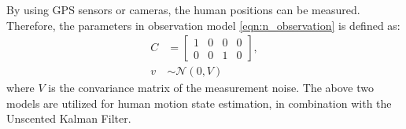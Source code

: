 \documentclass[letterpaper, 10 pt, conference]{ieeeconf}
\begin{document}
	By using GPS sensors or cameras, the human positions can be measured.
	Therefore, the parameters in observation model \cref{eqn:n_observation} is defined as:
	\begin{subequations}
		\begin{align}\label{eqn:meas_noise}
			C&=\left[
			\begin{array}{cccc}
			1& 0& 0& 0\\
			0& 0& 1& 0
			\end{array}\right],\\
			v&\sim\mathcal{N}(0,V)
		\end{align}
	\end{subequations}
	where $V$ is the convariance matrix of the measurement noise.
	The above two models are utilized for human motion state estimation, in combination with the Unscented Kalman Filter.
	
	
	
\end{document}
